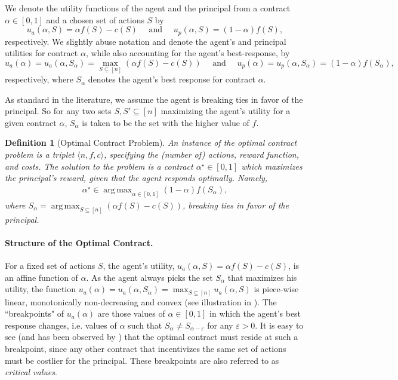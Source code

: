 \documentclass[11pt]{article}
\newtheorem{definition}{Definition}
\newcommand{\eps}{\varepsilon}
\DeclareMathOperator*{\argmax}{arg\,max}
\newcommand{\instance}{\langle n, f, c \rangle}
\begin{document}
We denote the utility functions of the agent and the principal  from a contract $\alpha \in [0,1]$ and a chosen set of actions $S$ by
$$
u_a(\alpha, S) = \alpha f(S) - c(S) \quad \mbox{ and }
\quad u_p(\alpha, S) = (1-\alpha) f(S),
$$
respectively.
We slightly abuse notation and denote the agent's and principal utilities for contract $\alpha$, while also accounting for the agent's best-response, by
$$
u_a(\alpha) = u_a(\alpha, S_\alpha) = \max_{S\subseteq [n]} (\alpha f(S) - c(S)) \quad \mbox{ and } \quad
u_p(\alpha) =  u_p(\alpha, S_\alpha) = (1-\alpha) f(S_\alpha),
$$
respectively, where $S_\alpha$ denotes the agent's best response for contract $\alpha$. 

As standard in the literature, we assume the agent is breaking ties in favor of the principal. 
So for any two sets $S,S' \subseteq [n]$ maximizing the agent's utility for a given contract $\alpha$, $S_\alpha$ is taken to be the set with the higher value of $f$. 

\begin{definition}[Optimal Contract Problem]\label{def:instance}
    An instance of the optimal contract problem is a triplet $\instance$, specifying the (number of) actions, reward function, and costs.
    The solution to the problem is a contract $\alpha^\star \in [0,1]$ which maximizes the principal's reward, given that the agent responds optimally. Namely,
    \begin{align*}
        \alpha^\star \in \argmax_{\alpha \in [0,1]} (1-\alpha)f(S_\alpha),
    \end{align*}
    where
    $S_\alpha = \argmax_{S \subseteq [n]} (\alpha f(S) - c(S))$, breaking ties in favor of the principal. 
\end{definition}

\paragraph{Structure of the Optimal Contract.}
For a fixed set of actions $S$, the agent's utility, $u_a(\alpha, S)= \alpha f(S) - c(S)$, is an affine function of $\alpha$. As the agent always picks the set $S_\alpha$ that maximizes his utility, the function $u_a(\alpha) = u_a(\alpha, S_\alpha) =  \max_{S \subseteq [n]} u_a(\alpha, S)$ is piece-wise linear, monotonically non-decreasing and convex (see illustration in ).
The ``breakpoints" of $u_a(\alpha)$ are those values of $\alpha \in [0,1]$ in which the agent's best response changes, i.e. values of $\alpha$ such that $S_\alpha \ne S_{\alpha - \eps}$ for any $\eps>0$. 
It is easy to see (and has been observed by \cite{dutting2022combinatorial}) that the optimal contract must reside at such a breakpoint, since any other contract that incentivizes the same set of actions must be costlier for the principal.
These breakpoints are also referred to as \emph{critical values}. 
\end{document}
